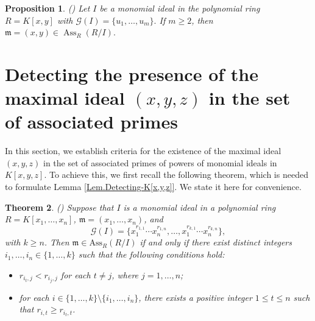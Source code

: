 \documentclass[11pt]{amsart}
\newtheorem{theorem}{Theorem}[section]
\newtheorem{lemma}[theorem]{Lemma}
\newtheorem{proposition}[theorem]{Proposition}
\begin{document}




\begin{proposition}(\cite[Proposition 2.2]{NR}) \label{K[x,y].1}
Let $I$ be a monomial ideal in the polynomial ring $R=K[x,y]$ with
 $\mathcal{G}(I)=\{u_1,\ldots,u_m\}.$ If $m\geq 2$, then
$\mathfrak m=(x,y)\in\operatorname{Ass}_R(R/I).$
\end{proposition}





\section{Detecting  the presence of the maximal  ideal $(x,y,z)$ in the set of associated primes} \label{Section3}
In  this section,  we establish criteria for the existence of  the maximal ideal $(x,y,z)$  in the set of associated primes of powers of 
 monomial ideals in $K[x,y,z]$.  To achieve this, we first recall the following theorem, which is needed to formulate Lemma \ref{Lem.Detecting-K[x,y,z]}. We state it here for convenience.



\begin{theorem} \label{Th.Detecting-General} (\cite[Theorem 2.3]{NR})
Suppose that  $I$ is a monomial ideal in a polynomial ring $R=K[x_1, \ldots, x_n]$, $\mathfrak{m}=(x_1, \ldots, x_n)$, and 
  $$\mathcal{G}(I)=\{x^{r_{1,1}}_1\cdots x^{r_{1,n}}_n, \ldots, x^{r_{k,1}}_1\cdots x^{r_{k,n}}_n\},$$ with $k\geq n$.  Then  $\mathfrak{m}\in \mathrm{Ass}_R(R/I)$ if and only if there exist  distinct  integers $i_1, \ldots, i_n \in \{1, \ldots, k\}$ such that  the following conditions hold:
\begin{itemize}
\item[(i)] $r_{i_t,j}<r_{i_j,j}$ for each  $t\neq j$, where $j=1, \ldots, n$;
\item[(ii)]  for each  $i\in\{1, \ldots, k\}\setminus \{i_1, \ldots, i_n\}$, there exists a positive integer $1\leq t \leq n$ such that $r_{i,t}\geq r_{i_t,t}$.
\end{itemize}
\end{theorem}
\end{document}
